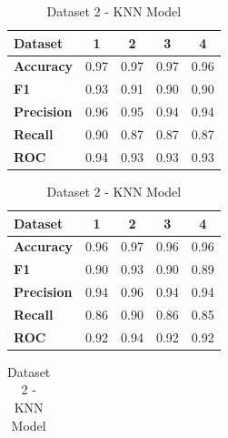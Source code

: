 \begin{table}[H]
  \centering
  \caption{KNN model cross-performance results}\label{tab:knn_model_cross-performance_results}
  \begin{subtable}[H]{0.45\textwidth}
    \centering
    \begin{tabular}{|l|c|c|c|c|}
      \hline
      \textbf{Dataset}   & \textbf{1} & \textbf{2} & \textbf{3} & \textbf{4} \\
      \hline
      \textbf{Accuracy}  & 0.97       & 0.97       & 0.97       & 0.96       \\
      \textbf{F1}        & 0.93       & 0.91       & 0.90       & 0.90       \\
      \textbf{Precision} & 0.96       & 0.95       & 0.94       & 0.94       \\
      \textbf{Recall}    & 0.90       & 0.87       & 0.87       & 0.87       \\
      \textbf{ROC}       & 0.94       & 0.93       & 0.93       & 0.93       \\
      \hline
    \end{tabular}
    \caption{Dataset 1 - KNN Model}\label{subtab:dataset_1_knn_model}
  \end{subtable}
  \quad
  \begin{subtable}[H]{0.45\textwidth}
    \centering
    \begin{tabular}{|l|c|c|c|c|}
      \hline
      \textbf{Dataset}   & \textbf{1} & \textbf{2} & \textbf{3} & \textbf{4} \\
      \hline
      \textbf{Accuracy}  & 0.96       & 0.97       & 0.96       & 0.96       \\
      \textbf{F1}        & 0.90       & 0.93       & 0.90       & 0.89       \\
      \textbf{Precision} & 0.94       & 0.96       & 0.94       & 0.94       \\
      \textbf{Recall}    & 0.86       & 0.90       & 0.86       & 0.85       \\
      \textbf{ROC}       & 0.92       & 0.94       & 0.92       & 0.92       \\
      \hline
    \end{tabular}
    \caption{Dataset 2 - KNN Model}\label{subtab:dataset_2_knn_model}
  \end{subtable}
  \quad
  \begin{subtable}[H]{0.45\textwidth}
    \centering
    \begin{tabular}{|l|c|c|c|c|}

\end{tabular}
\end{subtable}
\end{table}
